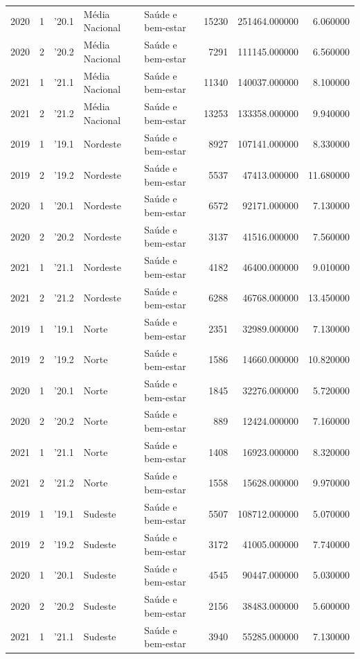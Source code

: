 \begin{longtable}{rrlllrrr}
2020 & 1 & '20.1 & Média Nacional & Saúde e bem-estar & 15230 & 251464.000000 & 6.060000 \\
2020 & 2 & '20.2 & Média Nacional & Saúde e bem-estar & 7291 & 111145.000000 & 6.560000 \\
2021 & 1 & '21.1 & Média Nacional & Saúde e bem-estar & 11340 & 140037.000000 & 8.100000 \\
2021 & 2 & '21.2 & Média Nacional & Saúde e bem-estar & 13253 & 133358.000000 & 9.940000 \\
2019 & 1 & '19.1 & Nordeste & Saúde e bem-estar & 8927 & 107141.000000 & 8.330000 \\
2019 & 2 & '19.2 & Nordeste & Saúde e bem-estar & 5537 & 47413.000000 & 11.680000 \\
2020 & 1 & '20.1 & Nordeste & Saúde e bem-estar & 6572 & 92171.000000 & 7.130000 \\
2020 & 2 & '20.2 & Nordeste & Saúde e bem-estar & 3137 & 41516.000000 & 7.560000 \\
2021 & 1 & '21.1 & Nordeste & Saúde e bem-estar & 4182 & 46400.000000 & 9.010000 \\
2021 & 2 & '21.2 & Nordeste & Saúde e bem-estar & 6288 & 46768.000000 & 13.450000 \\
2019 & 1 & '19.1 & Norte & Saúde e bem-estar & 2351 & 32989.000000 & 7.130000 \\
2019 & 2 & '19.2 & Norte & Saúde e bem-estar & 1586 & 14660.000000 & 10.820000 \\
2020 & 1 & '20.1 & Norte & Saúde e bem-estar & 1845 & 32276.000000 & 5.720000 \\
2020 & 2 & '20.2 & Norte & Saúde e bem-estar & 889 & 12424.000000 & 7.160000 \\
2021 & 1 & '21.1 & Norte & Saúde e bem-estar & 1408 & 16923.000000 & 8.320000 \\
2021 & 2 & '21.2 & Norte & Saúde e bem-estar & 1558 & 15628.000000 & 9.970000 \\
2019 & 1 & '19.1 & Sudeste & Saúde e bem-estar & 5507 & 108712.000000 & 5.070000 \\
2019 & 2 & '19.2 & Sudeste & Saúde e bem-estar & 3172 & 41005.000000 & 7.740000 \\
2020 & 1 & '20.1 & Sudeste & Saúde e bem-estar & 4545 & 90447.000000 & 5.030000 \\
2020 & 2 & '20.2 & Sudeste & Saúde e bem-estar & 2156 & 38483.000000 & 5.600000 \\
2021 & 1 & '21.1 & Sudeste & Saúde e bem-estar & 3940 & 55285.000000 & 7.130000 \\

\end{longtable}
